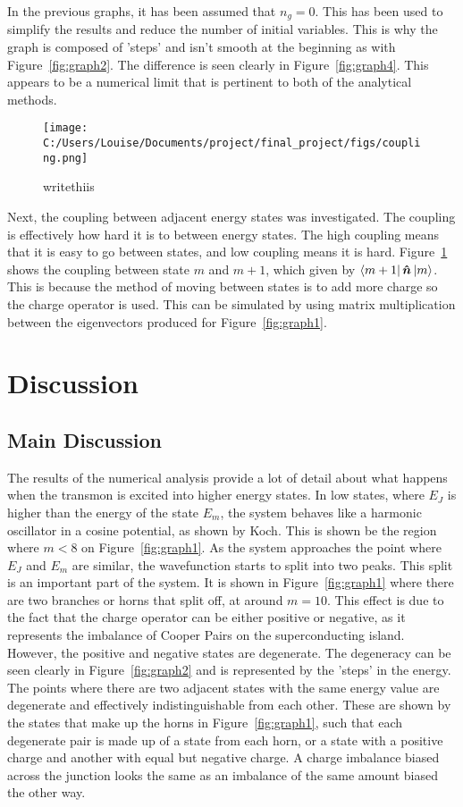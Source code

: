 \documentclass[11pt]{article}
\begin{document}
In the previous graphs, it has been assumed that $n_g = 0$. This has been used to simplify the results and reduce the number of initial variables. This is why the graph is composed of 'steps' and isn't smooth at the beginning as with Figure~\ref{fig:graph2}. The difference is seen clearly in Figure~\ref{fig:graph4}. This appears to be a numerical limit that is pertinent to both of the analytical methods.

\begin{figure}[ht]
\centering
\texttt{[image: C:/Users/Louise/Documents/project/final\_project/figs/coupling.png]}
\caption{writethiis}
\label{fig:graph5}
\end{figure}
Next, the coupling between adjacent energy states was investigated. The coupling is effectively how hard it is to between energy states. The high coupling means that it is easy to go between states, and low coupling means it is hard. Figure~\ref{fig:graph5} shows the coupling between state $m$ and $m+1$, which given by $\bra{m+1}\boldsymbol{\hat{n}}\ket{m}$. This is because the method of moving between states is to add more charge so the charge operator is used. This can be simulated by using matrix multiplication between the eigenvectors produced for Figure~\ref{fig:graph1}.

\section{Discussion}
\subsection{Main Discussion}
The results of the numerical analysis provide a lot of detail about what happens when the transmon is excited into higher energy states. In low states, where $E_J$ is higher than the energy of the state $E_m$, the system behaves like a harmonic oscillator in a cosine potential, as shown by Koch. This is shown be the region where $m<8$ on Figure~\ref{fig:graph1}. As the system approaches the point where $E_J$ and $E_m$ are similar, the wavefunction starts to split into two peaks. This split is an important part of the system. It is shown in Figure~\ref{fig:graph1} where there are two branches or horns that split off, at around $m=10$. This effect is due to the fact that the charge operator can be either positive or negative, as it represents the imbalance of Cooper Pairs on the superconducting island. However, the positive and negative states are degenerate. The degeneracy can be seen clearly in Figure~\ref{fig:graph2} and is represented by the 'steps' in the energy. The points where there are two adjacent states with the same energy value are degenerate and effectively indistinguishable from each other. These are shown by the states that make up the horns in Figure~\ref{fig:graph1}, such that each degenerate pair is made up of a state from each horn, or a state with a positive charge and another with equal but negative charge. A charge imbalance biased across the junction looks the same as an imbalance of the same amount biased the other way.
\end{document}
